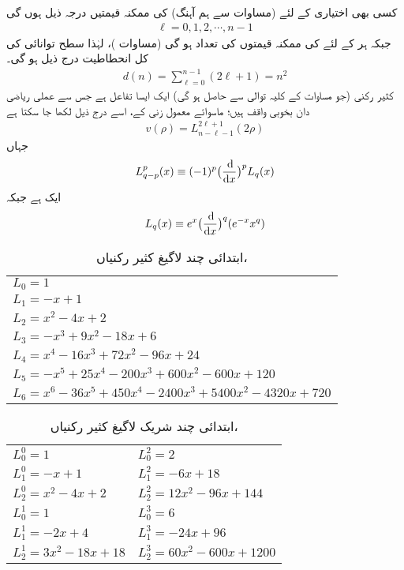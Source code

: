  کسی بھی اختیاری   کے لئے (مساوات  سے ہم آہنگ)  کی ممکنہ قیمتیں درجہ ذیل ہوں گی
\begin{align}
\ell=0,1,2,\cdots, n-1 
\end{align}
جبکہ ہر   کے لئے    کی ممکنہ قیمتوں کی تعداد    ہو گی (مساوات )،  لہٰذا      سطح توانائی کی کل انحطاطیت درج ذیل ہو گی۔ 
\begin{align}
d(n)=\sum_{\ell=0}^{n-1}(2\ell+1)=n^{2} 
\end{align}
کثیر رکنی  (جو مساوات  کے کلیہ توالی سے حاصل ہو گی) ایک ایسا تفاعل ہے جس سے عملی ریاضی دان بخوبی واقف ہیں؛  ماسوائے معمول زنی کے، اسے درج ذیل لکھا جا سکتا ہے
 \begin{align}\label{مساوات_تین_ابعادی_لاگیغ_الف}
v(\rho)=L_{n-\ell-1}^{2\ell+1}(2\rho) 
\end{align}
 جہاں
  \begin{align}\label{مساوات_تین_ابعادی_لاگیغ_ب}
L_{q-p}^{p}(x)\equiv(-1)^{p}\big(\frac{\dif}{\dif{x}}\big)^{p}L_{q}(x) 
\end{align} 
 ایک  ہے جبکہ 
\begin{align}\label{مساوات_تین_ابعادی_لاگیغ_پ}
 L_{q}(x)\equiv e^{x}\big(\frac{\dif}{\dif{x}}\big)^{q}(e^{-x}x^{q}) 
\end{align}
\begin{table}
\caption{ابتدائی چند لاگیغ کثیر رکنیاں، }
\label{جدول_ابعاد_لاگیغ_ابتدائی_چند}
\centering
\renewcommand{\arraystretch}{1.25}
\begin{tabular}{l}
\toprule
$L_0=1$\\
$L_1=-x+1$\\
$L_2=x^2-4x+2$\\
$L_3=-x^3+9x^2-18x+6$\\
$L_4=x^4-16x^3+72x^2-96x+24$\\
$L_5=-x^5+25x^4-200x^3+600x^2-600x+120$\\
$L_6=x^6-36x^5+450x^4-2400x^3+5400x^2-4320x+720$\\
\bottomrule
\end{tabular}
\end{table}
\begin{table}
\caption{ابتدائی چند شریک لاگیغ کثیر رکنیاں، }
\label{جدول_ابعادی_شریک_لاگیغ_کثیر_رکنیاں}
\centering
\renewcommand{\arraystretch}{1.25}
\begin{tabular}{ll}
\toprule
$L_0^0=1$  & $L_0^2=2$\\
$L_1^0=-x+1$  &  $L_1^2=-6x+18$\\
$L_2^0=x^2-4x+2$  &  $L_2^2=12x^2-96x+144$\\
$L_0^1=1$  &  $L_0^3=6$\\
$L_1^1=-2x+4$  &  $L_1^3=-24x+96$\\
$L_2^1=3x^2-18x+18$  &  $L_2^3=60x^2-600x+1200$\\
\bottomrule
\end{tabular}
\end{table}

